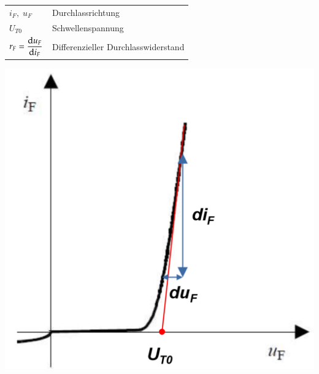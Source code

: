 \begin{multicols}{2}
     \begin{minipage}{\linewidth}
         \begin{tabular}{ll}
             $ i_F ,\; u_F $& Durchlassrichtung\\
             $ U_{T0} $& Schwellenspannung\\
             $ r_F= \dfrac{\mathop{}\!\mathrm{d} u_F}{\mathop{}\!\mathrm{d} i_F} $& Differenzieller Durchlasswiderstand\\
            \end{tabular}       
    \end{minipage}
        
        \includegraphics[width=0.4\linewidth]{images/dDiodeKennlinie}
\end{multicols}
\vspace{-1.5cm}
